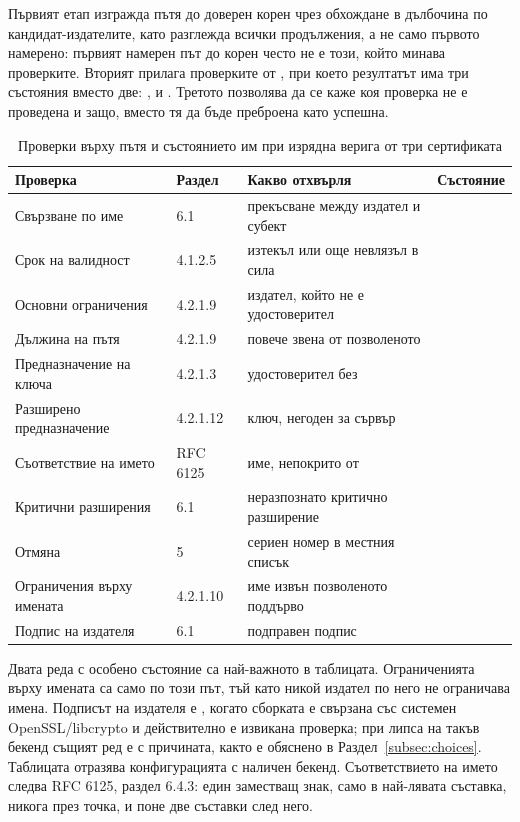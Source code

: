Първият етап изгражда пътя до доверен корен чрез обхождане в дълбочина по кандидат-издателите,
като разглежда всички продължения, а не само първото намерено: първият намерен път до корен често
не е този, който минава проверките. Вторият прилага проверките от \cite{rfc5280}
, при което резултатът има три състояния вместо две: , 
и . Третото позволява да се каже коя проверка не е проведена и защо, вместо тя да бъде
преброена като успешна.

\begin{table}[htbp]
\caption{Проверки върху пътя и състоянието им при изрядна верига от три сертификата}
\label{tab:checks}
\centering
\fontsize{10}{12}\selectfont
\begin{tabular}{L{4.8cm} l L{5.8cm} c}
\toprule
Проверка & Раздел & Какво отхвърля & Състояние \\
\midrule
Свързване по име & 6.1 & прекъсване между издател и субект &  \\
Срок на валидност & 4.1.2.5 & изтекъл или още невлязъл в сила &  \\
Основни ограничения & 4.2.1.9 & издател, който не е удостоверител &  \\
Дължина на пътя & 4.2.1.9 & повече звена от позволеното &  \\
Предназначение на ключа & 4.2.1.3 & удостоверител без  &  \\
Разширено предназначение & 4.2.1.12 & ключ, негоден за сървър &  \\
Съответствие на името & RFC 6125 & име, непокрито от  &  \\
Критични разширения & 6.1 & неразпознато критично разширение &  \\
Отмяна & 5 & сериен номер в местния списък &  \\
Ограничения върху имената & 4.2.1.10 & име извън позволеното поддърво &  \\
Подпис на издателя & 6.1 & подправен подпис &  \\
\bottomrule
\end{tabular}
\end{table}

Двата реда с особено състояние са най-важното в таблицата. Ограниченията върху имената са
 само по този път, тъй като никой издател по него не ограничава имена. Подписът на
издателя е , когато сборката е свързана със системен OpenSSL/libcrypto и
действително е извикана проверка; при липса на такъв бекенд същият ред е  с
причината, както е обяснено в Раздел~\ref{subsec:choices}. Таблицата отразява конфигурацията с
наличен бекенд.
Съответствието на името следва RFC 6125, раздел 6.4.3: един заместващ знак, само в най-лявата
съставка, никога през точка, и поне две съставки след него.

